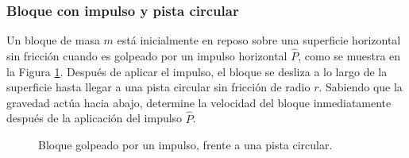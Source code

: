 \subsubsection{Bloque con impulso y pista circular}

Un bloque de masa $m$ está inicialmente en reposo sobre una superficie horizontal sin fricción cuando es golpeado por un impulso horizontal $\hat{P}$, como se muestra en la Figura \ref{fig:c2_e01_p23_bloque_impulso}. Después de aplicar el impulso, el bloque se desliza a lo largo de la superficie hasta llegar a una pista circular sin fricción de radio $r$. Sabiendo que la gravedad actúa hacia abajo, determine la velocidad del bloque inmediatamente después de la aplicación del impulso $\hat{P}$.

\begin{figure}[!ht]
    \centering
    \caption{Bloque golpeado por un impulso, frente a una pista circular.}
    \label{fig:c2_e01_p23_bloque_impulso}
\end{figure}


